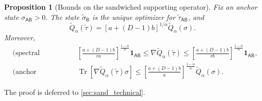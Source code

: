 \documentclass[11pt,reqno]{amsart}
\newtheorem{proposition}[proposition]{Proposition}
\theoremstyle{definition}
\DeclareMathOperator{\Tr}{Tr}
\newcommand{\I}{\mathbf 1}
\newcommand{\A}{\mathsf{A}}
\newcommand{\B}{\mathsf{B}}
\newcommand{\sand}{\widetilde}
\begin{document}
\begin{proposition}[Bounds on the sandwiched supporting operator]
\label{prop:sand_calibrated}
Fix an anchor state $\sigma_{\A\B} >0$.
The state $\sand\sigma_{\B}$ is the unique optimizer for
$\sand\tau_{\A\B}$, and
\begin{equation}
 \sand Q_{\alpha}(\sand\tau)
 =[a+(D-1)b]^{1/\alpha}\sand Q_{\alpha}(\sigma).
 \label{eq:comparison-value}
\end{equation}
Moreover,
\begin{align}
&\text{(spectral bounds)}
&&\left[\frac{a+(D-1)b}{ra}\right]^{\frac{1-\alpha}{\alpha}}
 \I_{\A\B}
\leq\nabla\sand Q_{\alpha}(\sand\tau)
\leq
\left[\frac{a+(D-1)b}{rb}\right]^{\frac{1-\alpha}{\alpha}}
 \I_{\A\B},
\label{eq:score-window}
\\
&\text{(anchor calibration)}
&&\Tr\!\left[\nabla\sand Q_{\alpha}(\sand\tau)\sigma\right]
\leq
\left[\frac{a+(D-1)b}{a}\right]^{\frac{1-\alpha}{\alpha}}
\sand Q_{\alpha}(\sigma).
\label{eq:sand-anchor-calibration}
\end{align}
\end{proposition}
\noindent The proof is deferred to \cref{sec:sand_technical}.
\end{document}
